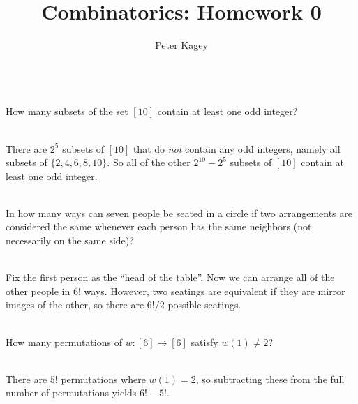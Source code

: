 \documentclass{article}
\newenvironment{problem}[2][Problem]{\begin{trivlist}
\item[\hskip \labelsep {\bfseries #1}\hskip \labelsep {\bfseries #2.}]}{\end{trivlist}}
\newenvironment{solution}[1][Solution.]{\begin{trivlist}
\item[\hskip \labelsep {\bfseries #1}]}{\end{trivlist}}
\begin{document}
\title{Combinatorics: Homework 0}
\author{Peter Kagey}

\maketitle

\begin{problem}{2 (a)} \text{} \\
  How many subsets of the set $[10]$ contain at least one odd integer?
\end{problem}

\begin{solution} \text{} \\
  There are $2^5$ subsets of $[10]$ that do \textit{not} contain any odd
  integers, namely all subsets of $\{2,4,6,8,10\}$.
  So all of the other $2^10 - 2^5$ subsets of $[10]$ contain at least one odd
  integer.
\end{solution}

\begin{problem}{2 (b)} \text{} \\
  In how many ways can seven people be seated in a circle if two arrangements
  are considered the same whenever each person has the same neighbors
  (not necessarily on the same side)?
\end{problem}

\begin{solution} \text{} \\
  Fix the first person as the ``head of the table''. Now we can arrange all of
  the other people in $6!$ ways. However, two seatings are equivalent if they
  are mirror images of the other, so there are $6!/2$ possible seatings.
\end{solution}

\begin{problem}{2 (c)} \text{} \\
  How many permutations of $w\colon [6] \rightarrow [6]$ satisfy $w(1) \neq 2$?
\end{problem}

\begin{solution} \text{} \\
  There are $5!$ permutations where $w(1) = 2$, so subtracting these from the
  full number of permutations yields $6! - 5!$.
\end{solution}
\end{document}
